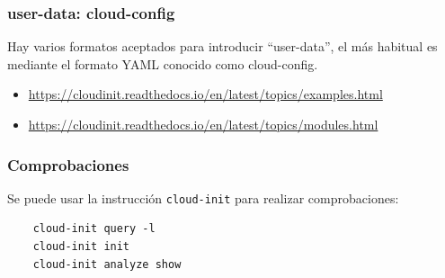 \documentclass[aspectratio=169]{beamer}
\begin{document}
\begin{frame}
  \frametitle{user-data: cloud-config}
  Hay varios formatos aceptados para introducir ``user-data'', el más
  habitual es mediante el formato YAML conocido como cloud-config.
  \begin{itemize}
  \item
    \url{https://cloudinit.readthedocs.io/en/latest/topics/examples.html}
  \item \url{https://cloudinit.readthedocs.io/en/latest/topics/modules.html}
  \end{itemize}
\end{frame}

\begin{frame}[fragile]
  \frametitle{Comprobaciones}
  Se puede usar la instrucción \texttt{cloud-init} para realizar comprobaciones:
  \begin{lstlisting}
    cloud-init query -l
    cloud-init init
    cloud-init analyze show
  \end{lstlisting}
\end{frame}
\end{document}
